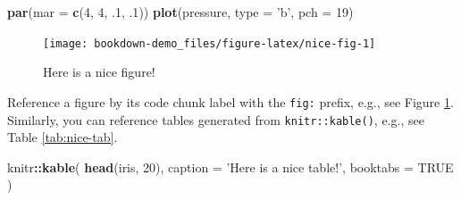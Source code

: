\documentclass[
]{book}
\newenvironment{Shaded}{\begin{snugshade}}{\end{snugshade}}
\newcommand{\DataTypeTok}[1]{\textcolor[rgb]{0.13,0.29,0.53}{#1}}
\newcommand{\DecValTok}[1]{\textcolor[rgb]{0.00,0.00,0.81}{#1}}
\newcommand{\FloatTok}[1]{\textcolor[rgb]{0.00,0.00,0.81}{#1}}
\newcommand{\KeywordTok}[1]{\textcolor[rgb]{0.13,0.29,0.53}{\textbf{#1}}}
\newcommand{\NormalTok}[1]{#1}
\newcommand{\OperatorTok}[1]{\textcolor[rgb]{0.81,0.36,0.00}{\textbf{#1}}}
\newcommand{\OtherTok}[1]{\textcolor[rgb]{0.56,0.35,0.01}{#1}}
\newcommand{\StringTok}[1]{\textcolor[rgb]{0.31,0.60,0.02}{#1}}
\begin{document}
\begin{Shaded}
\begin{Highlighting}[]
\KeywordTok{par}\NormalTok{(}\DataTypeTok{mar =} \KeywordTok{c}\NormalTok{(}\DecValTok{4}\NormalTok{, }\DecValTok{4}\NormalTok{, }\FloatTok{.1}\NormalTok{, }\FloatTok{.1}\NormalTok{))}
\KeywordTok{plot}\NormalTok{(pressure, }\DataTypeTok{type =} \StringTok{'b'}\NormalTok{, }\DataTypeTok{pch =} \DecValTok{19}\NormalTok{)}
\end{Highlighting}
\end{Shaded}

\begin{figure}

{\centering \texttt{[image: bookdown-demo\_files/figure-latex/nice-fig-1]} 

}

\caption{Here is a nice figure!}\label{fig:nice-fig}
\end{figure}

Reference a figure by its code chunk label with the \texttt{fig:} prefix, e.g., see Figure \ref{fig:nice-fig}. Similarly, you can reference tables generated from \texttt{knitr::kable()}, e.g., see Table \ref{tab:nice-tab}.

\begin{Shaded}
\begin{Highlighting}[]
\NormalTok{knitr}\OperatorTok{::}\KeywordTok{kable}\NormalTok{(}
  \KeywordTok{head}\NormalTok{(iris, }\DecValTok{20}\NormalTok{), }\DataTypeTok{caption =} \StringTok{'Here is a nice table!'}\NormalTok{,}
  \DataTypeTok{booktabs =} \OtherTok{TRUE}
\NormalTok{)}
\end{Highlighting}
\end{Shaded}
\end{document}
